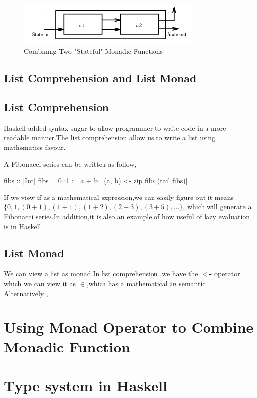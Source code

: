 \begin{figure}[H]
  \centering
	\includegraphics[width=0.80\textwidth]{pic/c3/state_monad.png}
	\caption{Combining Two "Stateful" Monadic Functions}
\end{figure}


\subsection{List Comprehension and List Monad}
\subsection{List Comprehension}
Haskell added syntax sugar to allow programmer to write code in a more readable manner.The list comprehension allow us to write a list using mathematics favour.

A Fibonacci series can be written as follow,
\begin{hcode}
fibs :: [Int]
fibs = 0 :1 : [ a + b | (a, b) <- zip fibs (tail fibs)]
\end{hcode}

If we view if as a mathematical expression,we can easily figure out it means $ \lbrace  0,1 ,(0+1),(1+1),(1+2),(2+3),(3+5),... \rbrace $, which will generate a Fibonacci series.In addition,it is also an example of how useful of lazy evaluation is in Haskell.

\subsection{List Monad}
We can view a list as monad.In list comprehension ,we have the \textbf{$<$-} operator which we can view it as $\in$,which has a mathematical $ in$  semantic.\\

Alternatively , 
\section{Using Monad Operator to Combine Monadic Function}

\section{Type system in Haskell}
